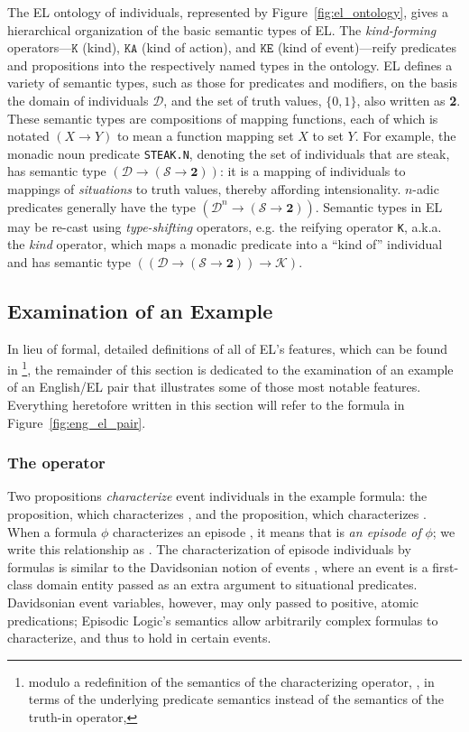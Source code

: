 The EL ontology of individuals, represented by Figure~\ref{fig:el_ontology}, gives a hierarchical organization of the basic semantic types of EL. The \textit{kind-forming} operators---$\texttt{K}$ (kind), $\texttt{KA}$ (kind of action), and $\texttt{KE}$ (kind of event)---reify predicates and propositions into the respectively named types in the ontology. EL defines a variety of semantic types, such as those for predicates and modifiers, on the basis the domain of individuals $\mathcal{D}$, and the set of truth values, $\{0,1\}$, also written as \textbf{2}. These semantic types are compositions of mapping functions, each of which is notated $(X \rightarrow Y)$ to mean a function mapping set $X$ to set $Y$. For example, the monadic noun predicate \texttt{STEAK.N}, denoting the set of individuals that are steak, has semantic type $(\mathcal{D} \rightarrow (\mathcal{S} \rightarrow \textbf{2}))$: it is a mapping of individuals to mappings of \textit{situations} to truth values, thereby affording intensionality. $n$-adic predicates generally have the type $(\mathcal{D}^{n} \rightarrow (\mathcal{S} \rightarrow \textbf{2}))$. Semantic types in EL may be re-cast using \textit{type-shifting} operators, e.g. the reifying operator \texttt{K}, a.k.a. the \textit{kind} operator, which maps a monadic predicate into a ``kind of'' individual and has semantic type $((\mathcal{D} \rightarrow (\mathcal{S} \rightarrow \textbf{2})) \rightarrow \mathcal{K})$.

\subsection{Examination of an Example}
In lieu of formal, detailed definitions of all of EL's features, which can be found in \citep{schubert2000episodic} \footnote{modulo a redefinition of the semantics of the characterizing operator, \el{**}, in terms of the underlying predicate semantics \citep{len-situations-2000} instead of the semantics of the truth-in operator, \el{*}}, the remainder of this section is dedicated to the examination of an example of an English/EL pair that illustrates some of those most notable features. Everything heretofore written in this section will refer to the formula in Figure~\ref{fig:eng_el_pair}.

\subsubsection{The \el{**} operator}
Two propositions \textit{characterize} event individuals in the example formula: the  proposition, which characterizes , and the  proposition, which characterizes . When a formula $\phi$ characterizes an episode , it means that  is \textit{an episode of} $\phi$; we write this relationship as . The characterization of episode individuals by formulas is similar to the Davidsonian notion of events \citep{Davidson1967}, where an event is a first-class domain entity passed as an extra argument to situational predicates. Davidsonian event variables, however, may only passed to positive, atomic predications; Episodic Logic's semantics allow arbitrarily complex formulas to characterize, and thus to hold in certain events.

